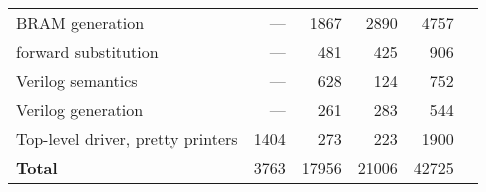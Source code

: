 \begin{table}
\begin{tabular}{lrrrrr}
    {BRAM generation}                     &  --- & 1867 & 2890 &  4757 \\
    {forward substitution}                &  --- &  481 &  425 &  906 \\
    {Verilog semantics}                   &  --- &  628 &  124 &  752 \\
    {Verilog generation}                  &  --- &  261 &  283 &  544 \\
    {Top-level driver, pretty printers}   & 1404 &  273 &  223 & 1900 \\
    \midrule
    \textbf{Total}                        & 3763 & 17956 & 21006 & 42725 \\
    \bottomrule
  \end{tabular}
\end{table}

